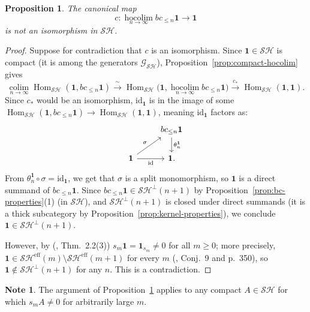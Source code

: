 \documentclass[12pt,a4paper]{article}
\newtheorem{proposition}[theorem]{Proposition}
\theoremstyle{definition}
\newtheorem{note}[theorem]{Note}
\newcommand{\SH}{\mathcal{SH}}
\newcommand{\hocolim}{\operatorname*{hocolim}}
\newcommand{\colim}{\operatorname*{colim}}
\newcommand{\Hom}{\operatorname{Hom}}
\newcommand{\id}{\mathrm{id}}
\begin{document}
\begin{proposition}\label{prop:counterexample}
The canonical map
\[
  c:\hocolim_{n\to\infty}bc_{\leq n}\mathbf{1}\longrightarrow\mathbf{1}
\]
is \emph{not} an isomorphism in $\SH$.
\end{proposition}
\begin{proof}
Suppose for contradiction that $c$ is an isomorphism.  Since
$\mathbf{1}\in\SH$ is compact (it is among the generators $\mathcal{G}_{\SH}$),
Proposition~\ref{prop:compact-hocolim} gives
\[
  \colim_{n\to\infty}\Hom_{\SH}(\mathbf{1},bc_{\leq n}\mathbf{1})
  \xrightarrow{\;\sim\;}
  \Hom_{\SH}\!\bigl(\mathbf{1},\hocolim_{n\to\infty}bc_{\leq n}\mathbf{1}\bigr)
  \xrightarrow{\;c_*\;}\Hom_{\SH}(\mathbf{1},\mathbf{1}).
\]
Since $c_*$ would be an isomorphism, $\id_{\mathbf{1}}$ is in the image of some
$\Hom_{\SH}(\mathbf{1},bc_{\leq n}\mathbf{1})\to\Hom_{\SH}(\mathbf{1},\mathbf{1})$,
meaning $\id_{\mathbf{1}}$ factors as:
\[
\begin{tikzcd}
  & bc_{\leq n}\mathbf{1} \ar[d,"\theta_n^{\mathbf{1}}"]\\
  \mathbf{1} \ar[ur,"\sigma"] \ar[r,"\id"'] & \mathbf{1}.
\end{tikzcd}
\]
From $\theta_n^{\mathbf{1}}\circ\sigma=\id_{\mathbf{1}}$, we get that $\sigma$ is a
split monomorphism, so $\mathbf{1}$ is a direct summand of $bc_{\leq n}\mathbf{1}$.
Since $bc_{\leq n}\mathbf{1}\in\SH^\perp(n+1)$ by Proposition~\ref{prop:bc-properties}(1)
(in $\SH$), and $\SH^\perp(n+1)$ is closed under direct summands (it is a thick
subcategory by Proposition~\ref{prop:kernel-properties}), we conclude
$\mathbf{1}\in\SH^\perp(n+1)$.

However, by (\cite{Voe02a}, Thm.\ 2.2(3)) $s_m\mathbf{1}=\mathbf{1}_{s_m}\neq 0$
for all $m\geq 0$; more precisely, $\mathbf{1}\in\SH^{\mathrm{eff}}(m)\setminus\SH^{\mathrm{eff}}(m+1)$
for every $m$ (\cite{Lev14}, Conj.\ 9 and p.\ 350), so $\mathbf{1}\notin\SH^\perp(n+1)$
for any $n$.  This is a contradiction.
\end{proof}

\begin{note}\label{note:counterexample-general}
The argument of Proposition~\ref{prop:counterexample} applies to any compact
$A\in\SH$ for which $s_mA\neq 0$ for arbitrarily large $m$.
\end{note}
\end{document}
